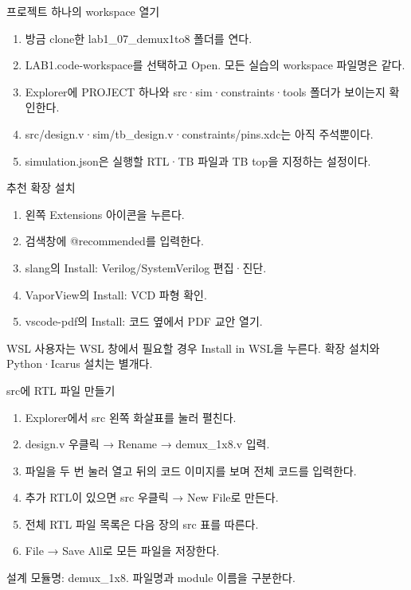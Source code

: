 \begin{frame}{프로젝트 하나의 workspace 열기}\relax
\small
\begin{enumerate}\setlength{\itemsep}{0.22cm}
\item 방금 clone한 lab1\_07\_demux1to8 폴더를 연다.
\item LAB1.code-workspace를 선택하고 Open. 모든 실습의 workspace 파일명은 같다.
\item Explorer에 PROJECT 하나와 src·sim·constraints·tools 폴더가 보이는지 확인한다.
\item src/design.v·sim/tb\_design.v·constraints/pins.xdc는 아직 주석뿐이다.
\item simulation.json은 실행할 RTL·TB 파일과 TB top을 지정하는 설정이다.
\end{enumerate}

\end{frame}

\begin{frame}{추천 확장 설치}\relax
\small
\begin{enumerate}\setlength{\itemsep}{0.22cm}
\item 왼쪽 Extensions 아이콘을 누른다.
\item 검색창에 @recommended를 입력한다.
\item slang의 Install: Verilog/SystemVerilog 편집·진단.
\item VaporView의 Install: VCD 파형 확인.
\item vscode-pdf의 Install: 코드 옆에서 PDF 교안 열기.
\end{enumerate}
WSL 사용자는 WSL 창에서 필요할 경우 Install in WSL을 누른다. 확장 설치와 Python·Icarus 설치는 별개다.\par
\end{frame}

\begin{frame}{src에 RTL 파일 만들기}\relax
\small
\begin{enumerate}\setlength{\itemsep}{0.22cm}
\item Explorer에서 src 왼쪽 화살표를 눌러 펼친다.
\item design.v 우클릭 → Rename → demux\_1x8.v 입력.
\item 파일을 두 번 눌러 열고 뒤의 코드 이미지를 보며 전체 코드를 입력한다.
\item 추가 RTL이 있으면 src 우클릭 → New File로 만든다.
\item 전체 RTL 파일 목록은 다음 장의 src 표를 따른다.
\item File → Save All로 모든 파일을 저장한다.
\end{enumerate}
설계 모듈명: demux\_1x8. 파일명과 module 이름을 구분한다.\par
\end{frame}

